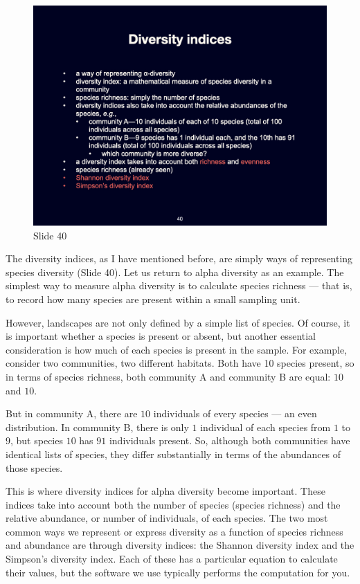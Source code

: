 \documentclass[
  11pt,
]{book}
\begin{document}
\begin{figure}[ht]
\centering
\includegraphics[width=0.8\linewidth]{../images/BDC334/BDC334-040.jpeg}
\caption*{Slide 40}
\end{figure}

The diversity indices, as I have mentioned before, are simply ways of
representing species diversity (Slide 40). Let us return to alpha
diversity as an example. The simplest way to measure alpha diversity is
to calculate species richness --- that is, to record how many species
are present within a small sampling unit.

However, landscapes are not only defined by a simple list of species. Of
course, it is important whether a species is present or absent, but
another essential consideration is how much of each species is present
in the sample. For example, consider two communities, two different
habitats. Both have 10 species present, so in terms of species richness,
both community A and community B are equal: \(10\) and \(10\).

But in community A, there are \(10\) individuals of every species --- an
even distribution. In community B, there is only \(1\) individual of
each species from \(1\) to \(9\), but species \(10\) has \(91\)
individuals present. So, although both communities have identical lists
of species, they differ substantially in terms of the abundances of
those species.

This is where diversity indices for alpha diversity become important.
These indices take into account both the number of species (species
richness) and the relative abundance, or number of individuals, of each
species. The two most common ways we represent or express diversity as a
function of species richness and abundance are through diversity
indices: the Shannon diversity index and the Simpson's diversity index.
Each of these has a particular equation to calculate their values, but
the software we use typically performs the computation for you.
\end{document}
